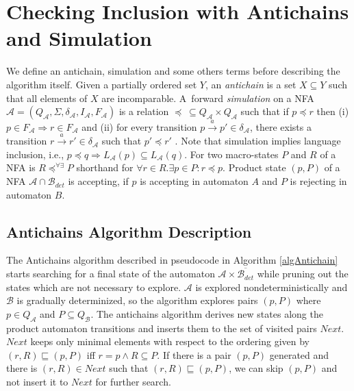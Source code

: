 \section{Checking Inclusion with Antichains and Simulation}
\label{sectionAntichain}
We define an antichain, simulation and some others terms before describing the algorithm itself.
Given a partially ordered set $Y$, an \emph {antichain} is a set $X \subseteq Y$ such that all elements of $X$ are incomparable.
A~forward \emph{simulation} on a NFA $\mathcal{A}=(Q_\mathcal{A},\Sigma,\delta_\mathcal{A},I_\mathcal{A},F_\mathcal{A})$ 
is a relation $\preceq\  \subseteq Q_\mathcal{A} \times Q_\mathcal{A}$ 
such that if $p \preceq r$ then (i) $p \in F_\mathcal{A} 
\Rightarrow r \in F_\mathcal{A}$ and (ii) for every transition $p\xrightarrow{a}p' \in \delta_\mathcal{A}$, there exists a transition 
$r\xrightarrow{a}r' \in \delta_\mathcal{A}$ such that $p' \preceq r'$  \cite{focs95}. 
Note that simulation implies language inclusion, i.e., $p\preceq q \Rightarrow L_\mathcal{A}(p)
\subseteq L_\mathcal{A}(q)$. %
%
For two macro-states $P$ and $R$ of a NFA is $R\preceq^{\forall\exists}P$ shorthand for $\forall r\in R.\exists p \in P: r \preceq p$.
Product state $(p,P)$ of a NFA $\mathcal{A} \cap \mathcal{B}_{det}$ is accepting, if $p$ is accepting in automaton $A$ and $P$ is rejecting in automaton $B$.

\subsection{Antichains Algorithm Description}
The Antichains algorithm \cite{cav06} described in pseudocode in Algorithm \ref{algAntichain} 
starts searching for a final state of the automaton $\mathcal{A}\times \overline{\mathcal{B}_{det}}$ while
pruning out the states which are not necessary to explore. $\mathcal{A}$ is explored nondeterministically and $\mathcal{B}$ 
is gradually determinized, so the algorithm explores pairs $(p,P)$ where $p\in Q_\mathcal{A}$ and $P \subseteq Q_\mathcal{B}$. 
The antichains algorithm derives new states along the product automaton transitions and inserts them to the set of visited pairs $Next$.
$Next$ keeps only minimal elements with respect to the ordering given by $(r,R)\sqsubseteq (p,P)$ iff $r=p \wedge R \subseteq P$. 
If there is a pair $(p,P)$ generated and there is 
$(r,R)\in Next$ such that $(r,R) \sqsubseteq (p,P)$, we can skip $(p,P)$ and not insert it to $Next$ for further search.
 
